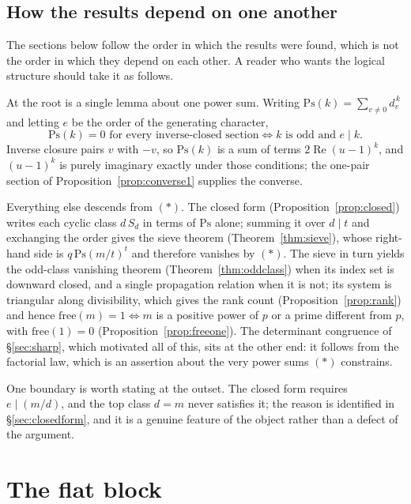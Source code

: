 \documentclass[11pt]{article}
\theoremstyle{plain}
\theoremstyle{definition}
\begin{document}
\subsection{How the results depend on one another}\label{sec:roadmap}

The sections below follow the order in which the results were found, which is
not the order in which they depend on each other. A reader who wants the
logical structure should take it as follows.

At the root is a single lemma about one power sum. Writing
$\mathrm{Ps}(k)=\sum_{v\neq0}d_v^{\,k}$ and letting $e$ be the order of the
generating character,
\[
\mathrm{Ps}(k)=0 \text{ for every inverse-closed section}
\iff k \text{ is odd and } e\mid k .
\tag{$\ast$}
\]
Inverse closure pairs $v$ with $-v$, so $\mathrm{Ps}(k)$ is a sum of terms
$2\operatorname{Re}(u-1)^{k}$, and $(u-1)^k$ is purely imaginary exactly under
those conditions; the one-pair section of Proposition~\ref{prop:converse1}
supplies the converse.

Everything else descends from $(\ast)$. The closed form
(Proposition~\ref{prop:closed}) writes each cyclic class $d\,S_d$ in terms of
$\mathrm{Ps}$ alone; summing it over $d\mid t$ and exchanging the order gives
the sieve theorem (Theorem~\ref{thm:sieve}), whose right-hand side is
$q\,\mathrm{Ps}(m/t)^{t}$ and therefore vanishes by $(\ast)$. The sieve in turn
yields the odd-class vanishing theorem (Theorem~\ref{thm:oddclass}) when its
index set is downward closed, and a single propagation relation when it is not;
its system is triangular along divisibility, which gives the rank count
(Proposition~\ref{prop:rank}) and hence
$\mathrm{free}(m)=1\iff m$ is a positive power of $p$ or a prime different
from $p$, with $\mathrm{free}(1)=0$ (Proposition~\ref{prop:freeone}).
The determinant congruence of \S\ref{sec:sharp}, which motivated all of this,
sits at the other end: it follows from the factorial law, which is an
assertion about the very power sums $(\ast)$ constrains.

One boundary is worth stating at the outset. The closed form requires
$e\mid(m/d)$, and the top class $d=m$ never satisfies it; the reason is
identified in \S\ref{sec:closedform}, and it is a genuine feature of the object
rather than a defect of the argument.

\section{The flat block}
\end{document}
